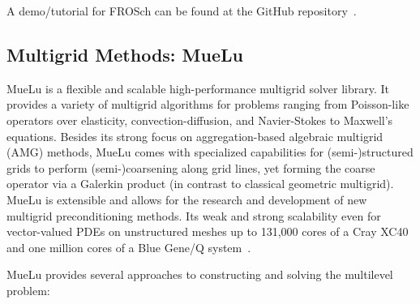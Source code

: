 A demo/tutorial for FROSch can be found at the GitHub repository~\cite{frosch_demo}.

\subsection{Multigrid Methods: MueLu}

MueLu is a flexible and scalable high-performance multigrid solver library.
It provides a variety of multigrid algorithms for problems ranging from Poisson-like operators over elasticity, convection-diffusion, and Navier-Stokes to Maxwell’s equations.
Besides its strong focus on aggregation-based algebraic multigrid (AMG) methods,
MueLu comes with specialized capabilities for (semi-)structured grids to perform (semi-)coarsening along grid lines,
yet forming the coarse operator via a Galerkin product (in contrast to classical geometric multigrid).
MueLu is extensible and allows for the research and development of new multigrid preconditioning methods.
Its weak and strong scalability even for vector-valued PDEs on unstructured meshes
up to 131,000 cores of a Cray XC40 and one million cores of a Blue Gene/Q system~\cite{Lin2017a,Thomas2019a}. 


MueLu provides several approaches to constructing and solving the multilevel problem:

